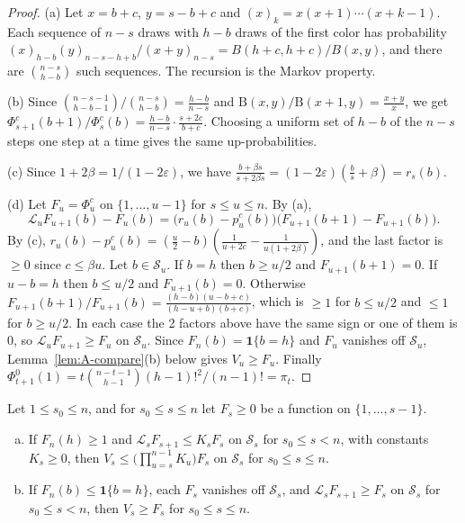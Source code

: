 \begin{proof}
(a) Let $x=b+c$, $y=s-b+c$ and $(x)_k=x(x+1)\cdots(x+k-1)$. Each sequence
of $n-s$ draws with $h-b$ draws of the first color has probability
$(x)_{h-b}(y)_{n-s-h+b}/(x+y)_{n-s}=B(h+c,h+c)/B(x,y)$, and there are
$\binom{n-s}{h-b}$ such sequences. The recursion is the Markov property.

(b) Since $\binom{n-s-1}{h-b-1}/\binom{n-s}{h-b}=\frac{h-b}{n-s}$ and
$\mathrm B(x,y)/\mathrm B(x+1,y)=\frac{x+y}x$, we get
$\Phi^c_{s+1}(b+1)/\Phi^c_s(b)=\frac{h-b}{n-s}\cdot\frac{s+2c}{b+c}$.
Choosing a uniform set of $h-b$ of the $n-s$ steps one step at a time gives
the same up-probabilities.

(c) Since $1+2\beta=1/(1-2\varepsilon)$, we have
$\frac{b+\beta s}{s+2\beta s}=(1-2\varepsilon)(\frac bs+\beta)=r_s(b)$.

(d) Let $F_u=\Phi^c_u$ on $\{1,\dots,u-1\}$ for $s\le u\le n$. By (a),
\[
 \mathcal L_uF_{u+1}(b)-F_u(b)=\bigl(r_u(b)-p^c_u(b)\bigr)\bigl(F_{u+1}(b+1)-F_{u+1}(b)\bigr).
\]
By (c), $r_u(b)-p^c_u(b)=(\frac u2-b)(\frac1{u+2c}-\frac1{u(1+2\beta)})$,
and the last factor is $\ge0$ since $c\le\beta u$. Let $b\in\mathcal S_u$.
If $b=h$ then $b\ge u/2$ and $F_{u+1}(b+1)=0$. If $u-b=h$ then $b\le u/2$
and $F_{u+1}(b)=0$. Otherwise
$F_{u+1}(b+1)/F_{u+1}(b)=\frac{(h-b)(u-b+c)}{(h-u+b)(b+c)}$, which is $\ge1$
for $b\le u/2$ and $\le1$ for $b\ge u/2$. In each case the 2 factors above
have the same sign or one of them is 0, so $\mathcal L_uF_{u+1}\ge F_u$ on
$\mathcal S_u$. Since $F_n(b)=\mathbf 1\{b=h\}$ and $F_u$ vanishes off
$\mathcal S_u$, Lemma~\ref{lem:A-compare}(b) below gives $V_u\ge F_u$.
Finally $\Phi^0_{t+1}(1)=t\binom{n-t-1}{h-1}(h-1)!^2/(n-1)!=\pi_t$.
\end{proof}

\begin{lemma}\label{lem:A-compare}
Let $1\le s_0\le n$, and for $s_0\le s\le n$ let $F_s\ge0$ be a function on
$\{1,\dots,s-1\}$.
\begin{enumerate}[(a)]
\item If $F_n(h)\ge1$ and $\mathcal L_sF_{s+1}\le K_sF_s$ on $\mathcal S_s$
for $s_0\le s<n$, with constants $K_s\ge0$, then
$V_s\le\bigl(\prod_{u=s}^{n-1}K_u\bigr)F_s$ on $\mathcal S_s$ for
$s_0\le s\le n$.
\item If $F_n(b)\le\mathbf 1\{b=h\}$, each $F_s$ vanishes off $\mathcal S_s$,
and $\mathcal L_sF_{s+1}\ge F_s$ on $\mathcal S_s$ for $s_0\le s<n$, then
$V_s\ge F_s$ for $s_0\le s\le n$.
\end{enumerate}
\end{lemma}

